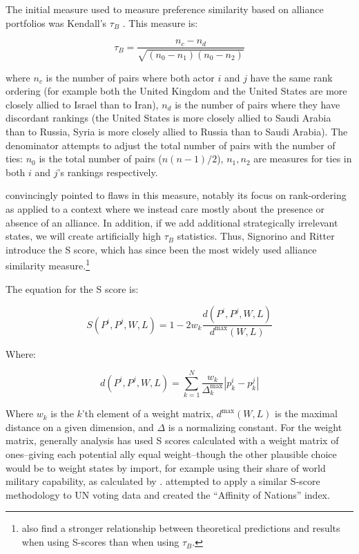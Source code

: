  The initial measure used to measure preference similarity based on alliance portfolios was Kendall's $\tau_{B}$ \citep{buenodemesquita:lalman:2008}. This measure is:
 
 \begin{equation}
	 \tau_{B} = \frac{n_{c} - n_{d}}{\sqrt{(n_{0} - n_{1})(n_{0} - n_{2})}}
 \end{equation}
 
 where $n_{c}$ is the number of pairs where both actor $i$ and $j$ have the same rank ordering (for example both the United Kingdom and the United States are more closely allied to Israel than to Iran), $n_{d}$ is the number of pairs where they have discordant rankings (the United States is more closely allied to Saudi Arabia than to Russia, Syria is more closely allied to Russia than to Saudi Arabia). The denominator attempts to adjust the total number of pairs with the number of ties: $n_{0}$ is the total number of pairs ($n(n-1)/2$), $n_{1}, n_{2}$ are measures for ties in both $i$ and $j$'s rankings respectively.
 
\citet{signorino:ritter:1999} convincingly pointed to flaws in this measure, notably its focus on rank-ordering as applied to a context where we instead care mostly about the presence or absence of an alliance. In addition, if we add additional strategically irrelevant states, we will create artificially high $\tau_{B}$ statistics. Thus, Signorino and Ritter introduce the S score, which has since been the most widely used alliance similarity measure.\footnote{\citet{bennett:rupert:2003} also find a stronger relationship between theoretical predictions and results when using S-scores than when using $\tau_{B}$.}

The equation for the S score is:

\begin{equation}
	S(P^i, P^j, W, L) = 1 - 2w_k \frac{d(P^i, P^j, W, L)}{d^{\text{max}}(W,L)}
\end{equation}

Where:

\begin{equation}
	d(P^i, P^j, W, L) = \sum_{k = 1}^N \frac{w_k}{\Delta^\text{max}_{k}} |p^i_k - p^j_k|
\end{equation}

Where $w_k$ is the $k$'th element of a weight matrix, $d^\text{max}(W,L)$ is the maximal distance on a given dimension, and $\Delta$ is a normalizing constant. For the weight matrix, generally analysis has used S scores calculated with a weight matrix of ones--giving each potential ally equal weight--though the other plausible choice would be to weight states by import, for example using their share of world military capability, as calculated by \citet{singer:small:1995}. \citet{gartzke:1998} attempted to apply a similar S-score methodology to UN voting data and created the ``Affinity of Nations'' index.

